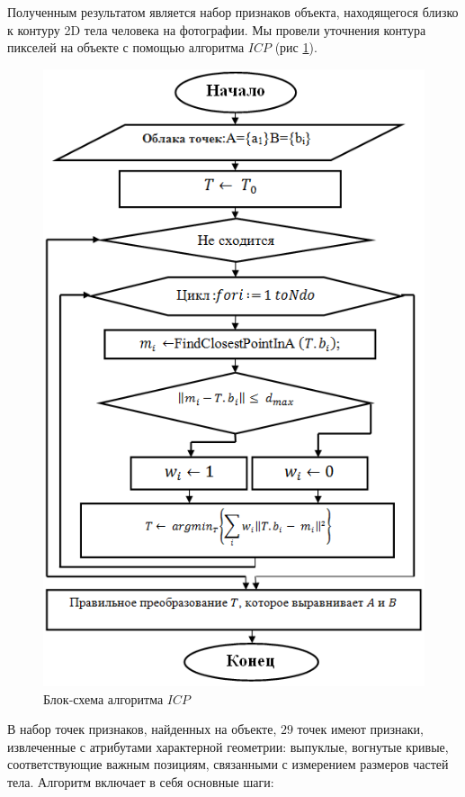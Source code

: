 Полученным результатом является набор признаков объекта, находящегося близко к контуру 2D тела человека на фотографии. Мы провели уточнения контура пикселей на объекте с помощью алгоритма $ICP$ (рис \ref{img13}).
\begin{figure}[ht!]
\centering
\includegraphics [scale=1] {images/h13.png}
\begin{center}
\caption{Блок-схема алгоритма $ICP$} \label{img13}
\end{center}
\end{figure}
В набор точек признаков, найденных на объекте, $29$ точек имеют признаки, извлеченные с атрибутами характерной геометрии: выпуклые, вогнутые кривые, соответствующие важным позициям, связанными с измерением размеров частей тела. Алгоритм включает в себя основные шаги:

